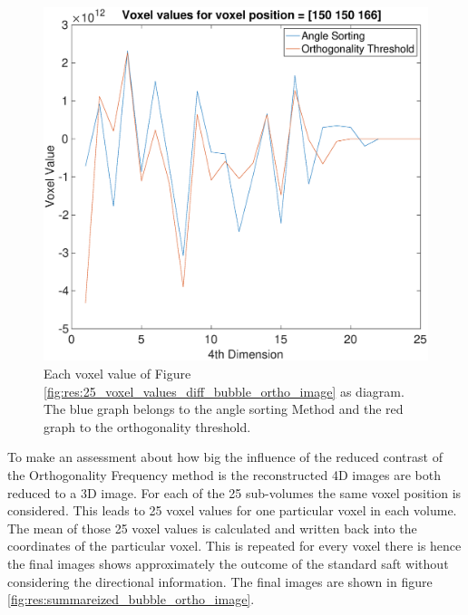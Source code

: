 \begin{figure}[H]
    \centering
    \includegraphics[width=0.82\linewidth]{Graphics/Results/Diff_angle_sort_orthogonality/diff_ortho_bubble_voxelvalues_150150166_sort.eps}
    \caption{Each voxel value of Figure \ref{fig:res:25_voxel_values_diff_bubble_ortho_image} as diagram. The blue graph belongs to the angle sorting Method and the red graph to the orthogonality threshold. }
    \label{fig:Voxel_value_25}
\end{figure}


To make an assessment about how big the influence of the reduced contrast of the Orthogonality Frequency method is the reconstructed 4D images are both reduced to a 3D image. For each of the 25 sub-volumes the same voxel position is considered. This leads to 25 voxel values for one particular voxel in each volume. The mean of those 25 voxel values is calculated and written back into the coordinates of the particular voxel. This is repeated for every voxel there is hence the final images shows approximately the outcome of the standard \ac{saft} without considering the directional information. The final images are shown in figure \ref{fig:res:summareized_bubble_ortho_image}.





